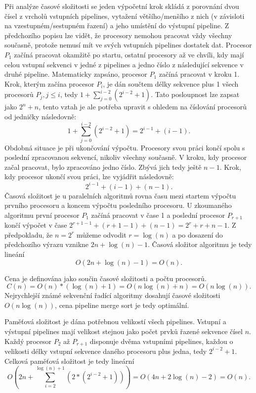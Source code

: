 \documentclass[a4paper, 12pt]{article}[21.3.2015]
\begin{document}
Při analýze časové složitosti se jeden výpočetní krok skládá z porovnání dvou čísel z vrcholů vstupních pipelines, vytažení většího/menšího z nich (v závisloti na vzestupném/sestupném řazení) a jeho umístění do výstupní pipeline. Z předchozího popisu lze vidět, že procesory nemohou pracovat vždy všechny současně, protože nemusí mít ve svých vstupních pipelines dostatek dat. Procesor \(P_1\) začíná pracovat okamžitě po startu, ostatní procesory až ve chvíli, kdy mají celou vstupní sekvenci v jedné z pipelines a jedno číslo z následující sekvence v druhé pipeline. Matematicky zapsáno, procesor \(P_1\) začíná pracovat v kroku 1. Krok, kterým začína procesor \(P_i\), je dán součtem délky sekvence plus 1 všech procesorů \(P_j, j \leq i\), tedy \(1 + \sum_{j = 0}^{i - 2}(2^{i - 2} + 1)\). Tato posloupnost lze zapsat jako \(2^n + n\), tento vztah je ale potřeba upravit s ohledem na číslování procesorů od jedničky následovně:
\[
	1 + \sum_{j = 0}^{i - 2}(2^{i - 2} + 1) = 2^{i - 1} + (i - 1).
\]
Obdobná situace je při ukončování výpočtu. Procesory svou práci končí spolu s poslední zpracovanou sekvencí, nikoliv všechny současně. V kroku, kdy procesor začal pracovat, bylo zpracováno jedno číslo. Zbývá jich tedy ještě \(n - 1\). Krok, kdy procesor ukončí svou práci, lze vyjádřit následovně:
\[
	2^{i - 1} + (i - 1) + (n - 1).
\]
Časová složitost je u paralelních algoritmů rovna času mezi startem výpočtu prvního procesoru a koncem výpočtu posledního procesoru. U zkoumaného algoritmu první procesor \(P_1\) začíná pracovat v čase 1 a poslední procesor \(P_{r + 1}\) končí výpočet v čase \(2^{r + 1 - 1} + (r + 1 - 1) + (n - 1) = 2^r + r + n - 1\). Z předpokladu, že \(n = 2^r\) můžeme odvodit \(r = \log(n)\) a po dosazení do předchozího výrazu vznikne \(2n + \log(n) - 1\). Časová složitor algoritmu je tedy lineání
\[
	O(2n + \log(n) - 1) = O(n).
\]

Cena je definována jako součin časové složitosti a počtu procesorů.
\[
	C(n) = O(n) * (\log(n) + 1) = O(n\log(n) + n) = O(n\log(n)).
\]
Nejrychlejší známé sekvenční řadící algoritmy dosahují časové složitosti \(O(n\log(n))\), cena pipeline merge sort je tedy optimální.

Paměťová složitost je dána potřebnou velikostí všech pipelines. Vstupní a výstupní pipelines mají velikost stejnou jako počet prvků řazené sekvence čísel \(n\). Každý procesor \(P_2\) až \(P_{r + 1}\) disponuje dvěma vstupními pipelines, každou o velikosti délky vstupní sekvence daného procesoru plus jedna, tedy \(2^{i - 2} + 1\). Celková paměťová složitost je tedy lineární
\[
	O(2n + \sum_{i = 2}^{\log(n) + 1}(2 * (2^{i - 2} + 1))) = O(4n + 2\log(n) - 2) = O(n).
\]
\end{document}
